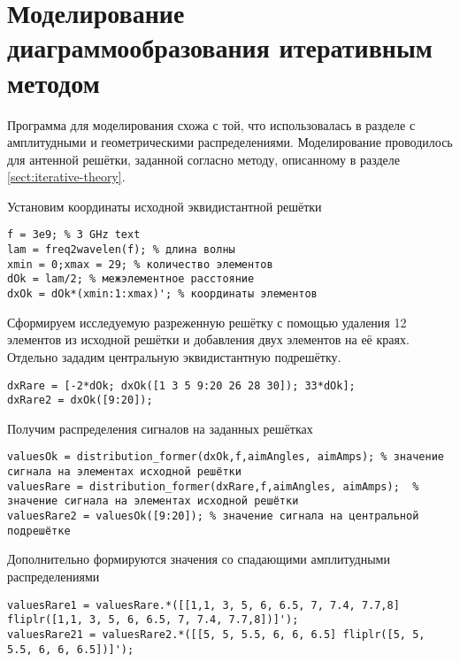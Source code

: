 \section{Моделирование диаграммообразования итеративным методом}\label{sect:iterative-modeling}

Программа для моделирования схожа с той, что использовалась 
в разделе с амплитудными и геометрическими распределениями. 
Моделирование проводилось для антенной решётки, заданной согласно методу, описанному в разделе \ref{sect:iterative-theory}.

Установим координаты исходной эквидистантной решётки

\begin{verbatim}
f = 3e9; % 3 GHz text
lam = freq2wavelen(f); % длина волны
xmin = 0;xmax = 29; % количество элементов
dOk = lam/2; % межэлементное расстояние
dxOk = dOk*(xmin:1:xmax)'; % координаты элементов     
\end{verbatim}

Сформируем исследуемую разреженную решётку с помощью удаления 12 элементов из исходной решётки и 
добавления двух элементов на её краях. Отдельно зададим центральную эквидистантную подрешётку.

\begin{verbatim}
dxRare = [-2*dOk; dxOk([1 3 5 9:20 26 28 30]); 33*dOk];
dxRare2 = dxOk([9:20]);   
\end{verbatim}

Получим распределения сигналов на заданных решётках

\begin{verbatim}
valuesOk = distribution_former(dxOk,f,aimAngles, aimAmps); % значение сигнала на элементах исходной решётки
valuesRare = distribution_former(dxRare,f,aimAngles, aimAmps);  % значение сигнала на элементах исходной решётки
valuesRare2 = valuesOk([9:20]); % значение сигнала на центральной подрешётке
\end{verbatim}

Дополнительно формируются значения со спадающими амплитудными распределениями

\begin{verbatim}
valuesRare1 = valuesRare.*([[1,1, 3, 5, 6, 6.5, 7, 7.4, 7.7,8] fliplr([1,1, 3, 5, 6, 6.5, 7, 7.4, 7.7,8])]');
valuesRare21 = valuesRare2.*([[5, 5, 5.5, 6, 6, 6.5] fliplr([5, 5, 5.5, 6, 6, 6.5])]');  
\end{verbatim}

